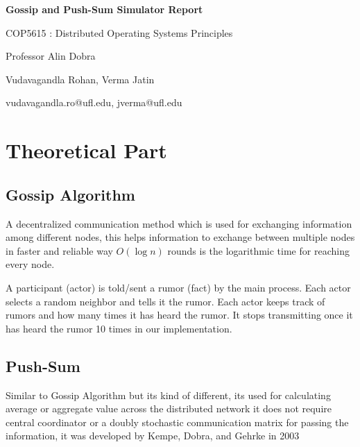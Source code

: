 \documentclass[conference]{styles/acmsiggraph}
\begin{document}
\begin{titlepage}
  \centering
  \vspace*{\fill}

  {\huge\bfseries Gossip and Push-Sum Simulator Report\par}
  \vspace{1em}
  {\LARGE COP5615 : Distributed Operating Systems Principles\par}
  \vspace{0.5em}
  {\large Professor Alin Dobra\par}
  \vspace{2em}
  {\Large Vudavagandla Rohan, Verma Jatin\par}
  \vspace{0.5em}
  {\normalsize vudavagandla.ro@ufl.edu, jverma@ufl.edu\par}

  \vspace*{\fill}
\end{titlepage}
\clearpage

\section{Theoretical Part}
\subsection{Gossip Algorithm}
A decentralized communication method which is used for exchanging information among different nodes, this helps information to exchange between multiple nodes in faster and reliable way 
$O(\log n)$ rounds is the logarithmic  time for reaching every node.

A participant (actor) is told/sent a rumor (fact) by the main process.
Each actor selects a random neighbor and tells it the rumor.
Each actor keeps track of rumors and how many times it has heard the rumor. It stops transmitting once it has heard the rumor 10 times in our implementation.

\subsection{Push-Sum}
Similar to Gossip Algorithm but its kind of different, its used for calculating average or aggregate value across the distributed network 
it does not require central coordinator or a doubly stochastic communication matrix for passing the information, it was  developed by Kempe, Dobra, and Gehrke in 2003
\end{document}
